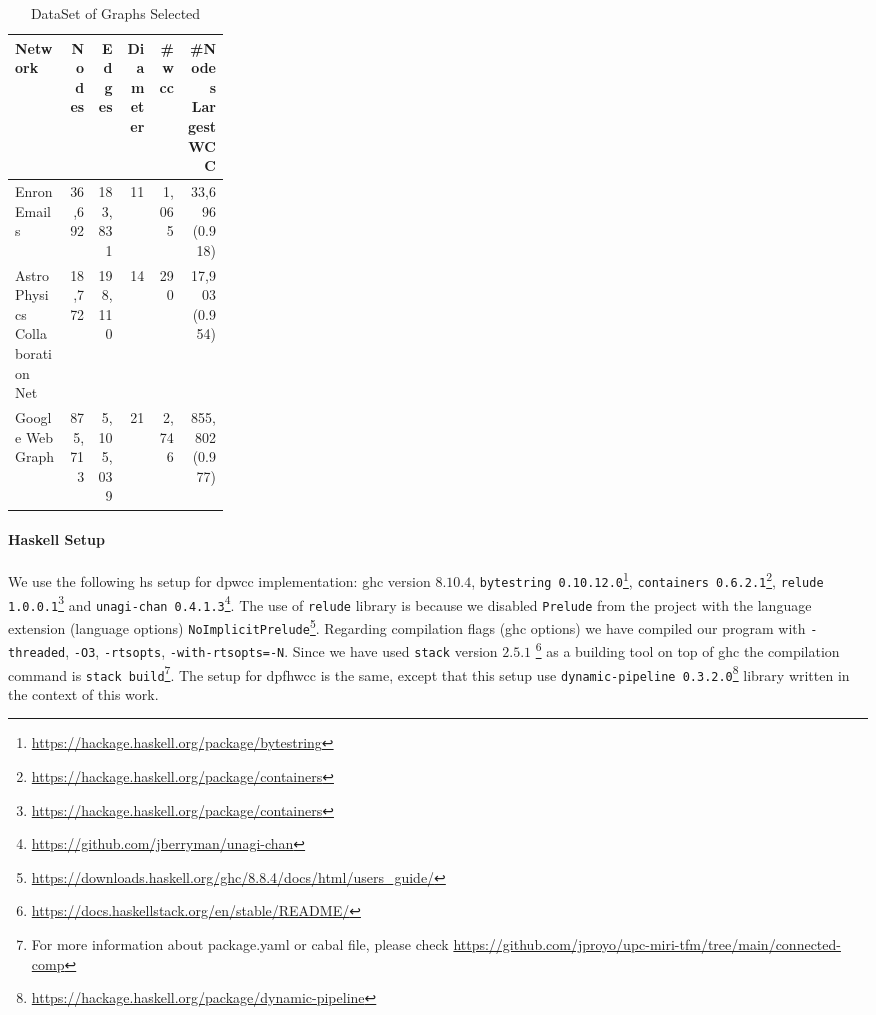 \begin{table}[H]
  \centering
  \begin{tabular}{|p{0.25\linewidth}|r|r|r|r|r|}
   \hline
   \textbf{Network} & \textbf{Nodes} & \textbf{Edges} & \textbf{Diameter} & \textbf{\#\acrshort{wcc}} & \textbf{\#Nodes Largest WCC} \\
   \hline
   Enron Emails & 36,692 & 183,831 & 11 & 1,065 & 33,696 (0.918) \\
   \hline
   Astro Physics Collaboration Net & 18,772 & 198,110 & 14 & 290 & 17,903 (0.954)\\
   \hline
   Google Web Graph & 875,713 & 5,105,039 & 21 & 2,746 & 855,802 (0.977)\\
   \hline
  \end{tabular}
 \caption{DataSet of Graphs Selected}
 \label{table:4}
 \end{table}
 
 \paragraph{Haskell Setup}
We use the following \acrshort{hs} setup for \acrshort{dpwcc} implementation: \acrshort{ghc} version $8.10.4$, \texttt{bytestring 0.10.12.0}\footnote{\url{https://hackage.haskell.org/package/bytestring}}, \texttt{containers 0.6.2.1}\footnote{\url{https://hackage.haskell.org/package/containers}}, \texttt{relude 1.0.0.1}\footnote{\url{https://hackage.haskell.org/package/containers}} and \texttt{unagi-chan 0.4.1.3}\footnote{\url{https://github.com/jberryman/unagi-chan}}. 
The use of \texttt{relude} library is because we disabled \texttt{Prelude} from the project with the language extension (language options) \texttt{NoImplicitPrelude}\footnote{\url{https://downloads.haskell.org/ghc/8.8.4/docs/html/users_guide/}}. 
Regarding compilation flags (\acrshort{ghc} options) we have compiled our program with \texttt{-threaded}, \texttt{-O3}, \texttt{-rtsopts}, \texttt{-with-rtsopts=-N}. 
Since we have used \texttt{stack} version $2.5.1$ \footnote{\url{https://docs.haskellstack.org/en/stable/README/}} as a building tool on top of \acrshort{ghc} the compilation command is \texttt{stack build}\footnote{For more information about package.yaml or cabal file, please check \url{https://github.com/jproyo/upc-miri-tfm/tree/main/connected-comp}}.
The setup for \acrshort{dpfhwcc} is the same, except that this setup use \texttt{dynamic-pipeline 0.3.2.0}\footnote{\url{https://hackage.haskell.org/package/dynamic-pipeline}} library written in the context of this work.


